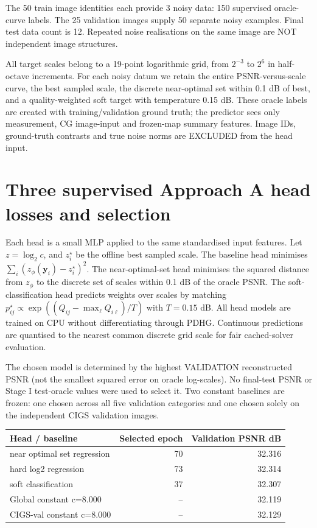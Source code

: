 \documentclass[11pt,a4paper]{article}
\begin{document}
The 50 train image identities each provide 3 noisy data: 150 supervised oracle-curve labels. The 25 validation images supply 50 separate noisy examples. Final test data count is 12. Repeated noise realisations on the same image are NOT independent image structures.

All target scales belong to a 19-point logarithmic grid, from $2^{-3}$ to $2^6$ in half-octave increments. For each noisy datum we retain the entire PSNR-versus-scale curve, the best sampled scale, the discrete near-optimal set within 0.1 dB of best, and a quality-weighted soft target with temperature 0.15 dB. These oracle labels are created with training/validation ground truth; the predictor sees only measurement, CG image-input and frozen-map summary features. Image IDs, ground-truth contrasts and true noise norms are EXCLUDED from the head input.

\section{Three supervised Approach A head losses and selection}

Each head is a small MLP applied to the same standardised input features. Let $z=\log_2 c$, and $z_i^\star$ be the offline best sampled scale. The baseline head minimises $\sum_i(z_\phi(\boldsymbol y_i)-z_i^\star)^2$. The near-optimal-set head minimises the squared distance from $z_\phi$ to the discrete set of scales within 0.1 dB of the oracle PSNR. The soft-classification head predicts weights over scales by matching $p^\star_{ij}\propto\exp((Q_{ij}-\max_\ell Q_{i\ell})/T)$ with $T=0.15$ dB. All head models are trained on CPU without differentiating through PDHG. Continuous predictions are quantised to the nearest common discrete grid scale for fair cached-solver evaluation.

The chosen model is determined by the highest VALIDATION reconstructed PSNR (not the smallest squared error on oracle log-scales). No final-test PSNR or Stage I test-oracle values were used to select it. Two constant baselines are frozen: one chosen across all five validation categories and one chosen solely on the independent CIGS validation images.

\begin{center}
\small
\begin{tabular}{lrr}
\toprule
Head / baseline & Selected epoch & Validation PSNR dB\\
\midrule
near optimal set regression & 70 & 32.316\\
hard log2 regression & 73 & 32.314\\
soft classification & 37 & 32.307\\
Global constant c=8.000 & -- & 32.119\\
CIGS-val constant c=8.000 & -- & 32.129\\
\bottomrule
\end{tabular}
\end{center}
\end{document}
